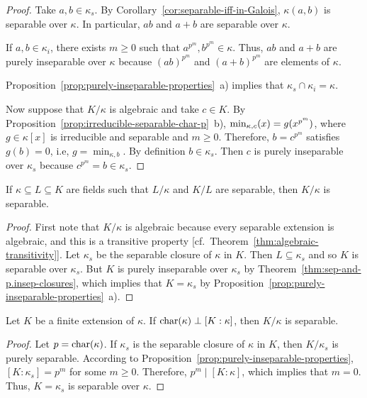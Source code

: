 \begin{proof}
    Take $a,b\in\kappa_s$. By Corollary~\ref{cor:separable-iff-in-Galois}, $\kappa(a,b)$ is separable over $\kappa$. In particular, $ab$ and $a+b$ are separable over $\kappa$.

    If $a,b\in\kappa_i$, there exists $m\ge0$ such that $a^{p^m},b^{p^m}\in\kappa$. Thus, $ab$ and $a+b$ are purely inseparable over $\kappa$ because $(ab)^{p^m}$ and $(a+b)^{p^m}$ are elements of $\kappa$.

    Proposition~\ref{prop:purely-inseparable-properties}~a) implies that $\kappa_s\cap \kappa_i=\kappa$.

    Now suppose that $K/\kappa$ is algebraic and take $c\in K$. By Proposition~\ref{prop:irreducible-separable-char-p}~b), $\operatorname{min}_{\kappa,c}(x)=g(x^{p^m})$, where $g\in\kappa[x]$ is irreducible and separable and $m\ge0$. Therefore, $b = c^{p^m}$ satisfies $g(b)=0$, i.e, $g=\min_{\kappa,b}$. By definition $b\in\kappa_s$. Then $c$ is purely inseparable over $\kappa_s$ because $c^{p^m}=b\in\kappa_s$.
\end{proof}

\begin{cor}\label{cor:separable-transitivity}
    If\/ $\kappa \subseteq L \subseteq K$ are fields such that\/ $L / \kappa$ and\/ $K / L$ are separable, then\/ $K / \kappa$ is separable.
\end{cor}

\begin{proof}
    First note that $K/\kappa$ is algebraic because every separable extension is algebraic, and this is a transitive property [cf.~Theorem~\ref{thm:algebraic-transitivity}]. Let $\kappa_s$ be the separable closure of $\kappa$ in $K$. Then $L\subseteq\kappa_s$ and so $K$ is separable over $\kappa_s$. But $K$ is purely inseparable over $\kappa_s$ by Theorem~\ref{thm:sep-and-p.insep-closures}, which implies that $K=\kappa_s$ by Proposition~\ref{prop:purely-inseparable-properties}~a).
    
\end{proof}

\begin{cor}
    Let\/ $K$ be a finite extension of\/ $\kappa$. If\/ $\operatorname{char}(\kappa)\perp[K:\kappa]$, then\/ $K / \kappa$ is separable.
\end{cor}

\begin{proof}
    Let $p=\operatorname{char}(\kappa)$. If $\kappa_s$ is the separable closure of $\kappa$ in $K$, then $K/\kappa_s$ is purely separable. According to Proposition~\ref{prop:purely-inseparable-properties}, $[K:\kappa_s]=p^m$ for some $m\ge0$. Therefore, $p^m\mid[K:\kappa]$, which implies that $m=0$. Thus, $K=\kappa_s$ is separable over $\kappa$.
\end{proof}

